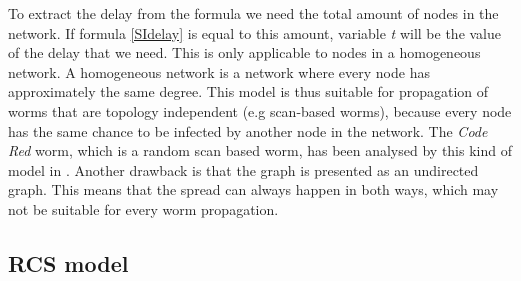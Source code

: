 
To extract the delay from the formula we need the total amount of nodes in the network. If formula \ref{SIdelay} is equal to this amount, variable \textit{t} will be the value of the delay that we need. This is only applicable to nodes in a homogeneous network. A homogeneous network is a network where every node has approximately the same degree. This model is thus suitable for propagation of worms that are topology independent (e.g scan-based worms), because every node has the same chance to be infected by another node in the network. The \textit{Code Red} worm, which is a random scan based worm, has been analysed by this kind of model in \cite{OwnInternetSI}. Another drawback is that the graph is presented as an undirected graph. This means that the spread can always happen in both ways, which may not be suitable for every worm propagation. 

\subsection{RCS model}

